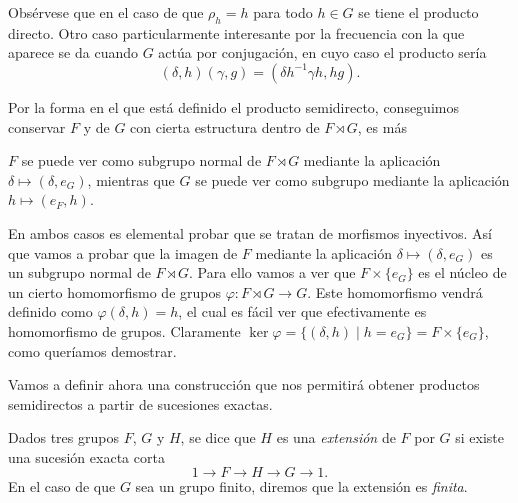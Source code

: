 \documentclass[TFG.tex]{subfiles}
\begin{document}
 Obsérvese que en el caso de que $\rho_h=h$ para todo $h\in G$ se tiene el producto directo. Otro caso particularmente interesante por la frecuencia con la que aparece se da cuando $G$ actúa por conjugación, en cuyo caso el producto sería
\[
(\delta,h)(\gamma,g)=(\delta h^{-1}\gamma h,hg).
\]

Por la forma en el que está definido el producto semidirecto, conseguimos conservar $F$ y de $G$ con cierta estructura dentro de $F\rtimes G$, es más 
\begin{prop}\label{reciproco}
 $F$ se puede ver como subgrupo normal de $F\rtimes G$ mediante la aplicación $\delta\mapsto (\delta,e_G)$, mientras que $G$ se puede ver como subgrupo mediante la aplicación $h\mapsto (e_F,h)$.
\end{prop}
\begin{dem}
En ambos casos es elemental probar que se tratan de morfismos inyectivos. Así que vamos a probar que la imagen de $F$ mediante la aplicación $\delta\mapsto (\delta,e_G)$ es un subgrupo normal de $F\rtimes G$. Para ello vamos a ver que $F\times\{e_G\}$ es el núcleo de un cierto homomorfismo de grupos $\varphi:F\rtimes G\to G$. Este homomorfismo vendrá definido como $\varphi(\delta,h)=h$, el cual es fácil ver que efectivamente es homomorfismo de grupos. Claramente $\ker\varphi=\{(\delta,h)\mid h=e_G\}=F\times\{e_G\}$, como queríamos demostrar. 
\QED
\end{dem}



Vamos a definir ahora una construcción que nos permitirá obtener productos semidirectos a partir de sucesiones exactas.

\begin{defi}
Dados tres grupos $F$, $G$ y $H$, se dice que $H$ es una \emph{extensión} de $F$ por $G$ si existe una sucesión exacta corta
\[
1\to F\to H\to G\to 1.
\]
En el caso de que $G$ sea un grupo finito, diremos que la extensión es \emph{finita}.
\end{defi} 
\end{document}
